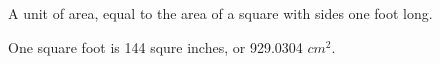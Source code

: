 A unit of area, equal to the area of a square with sides one foot long.
\par
One square foot is 144 squre inches, or 929.0304 $cm^{2}.$ 